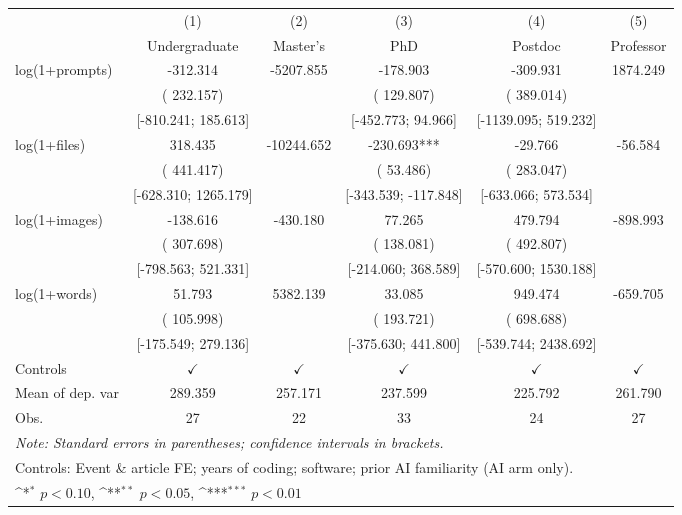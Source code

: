 \def\sym#1{\ifmmode^{#1}\else\(^{#1}\)\fi}
\begin{tabular}{l*{5}{c}}
\hline\hline
 & (1) & (2) & (3) & (4) & (5)
\\
 & Undergraduate & Master's & PhD & Postdoc & Professor
 \\
\hline
log(1+prompts) & -312.314 & -5207.855 & -178.903 & -309.931 &  1874.249
\\
 & ( 232.157) &  & ( 129.807) & ( 389.014) & 
\\
 & [-810.241;  185.613] &  & [-452.773;  94.966] & [-1139.095;  519.232] & 
\\
log(1+files) &  318.435 & -10244.652 & -230.693*** & -29.766 & -56.584
\\
 & ( 441.417) &  & ( 53.486) & ( 283.047) & 
\\
 & [-628.310;  1265.179] &  & [-343.539; -117.848] & [-633.066;  573.534] & 
\\
log(1+images) & -138.616 & -430.180 &  77.265 &  479.794 & -898.993
\\
 & ( 307.698) &  & ( 138.081) & ( 492.807) & 
\\
 & [-798.563;  521.331] &  & [-214.060;  368.589] & [-570.600;  1530.188] & 
\\
log(1+words) &  51.793 &  5382.139 &  33.085 &  949.474 & -659.705
\\
 & ( 105.998) &  & ( 193.721) & ( 698.688) & 
\\
 & [-175.549;  279.136] &  & [-375.630;  441.800] & [-539.744;  2438.692] & 
\\
\hline
Controls & $\checkmark$ & $\checkmark$ & $\checkmark$ & $\checkmark$ & $\checkmark$
\\
Mean of dep. var &  289.359 &  257.171 &  237.599 &  225.792 &  261.790
\\
Obs. & 27 & 22 & 33 & 24 & 27
\\
\hline
\hline\hline
\multicolumn{6}{l}{\it{Note:} Standard errors in parentheses; confidence intervals in brackets.}\\
\multicolumn{6}{l}{Controls: Event \& article FE; years of coding; software; prior AI familiarity (AI arm only).}\\
\multicolumn{6}{l}{\sym{*} $p<0.10$, \sym{**} $p<0.05$,  \sym{***} $p<0.01$}\\
\end{tabular}

